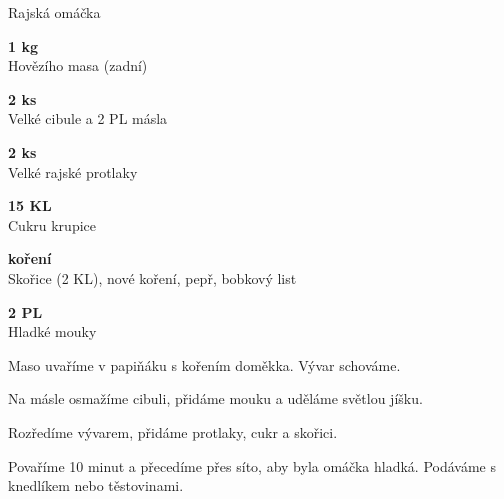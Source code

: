 \documentclass[11pt,a4paper]{article}
\begin{document}
\begin{recipe}[BrickRed]{Rajská omáčka}
    \begin{ingredients}
        \item \parbox[t]{\linewidth}{\raggedright \weight \textbf{1 kg}\\ Hovězího masa (zadní)}
        \item \parbox[t]{\linewidth}{\raggedright \piece \textbf{2 ks}\\ Velké cibule a 2 PL másla}
        \item \parbox[t]{\linewidth}{\raggedright \liquid \textbf{2 ks}\\ Velké rajské protlaky}
        \item \parbox[t]{\linewidth}{\raggedright \piece \textbf{15 KL}\\ Cukru krupice}
        \item \parbox[t]{\linewidth}{\raggedright \indefinite \textbf{koření}\\ Skořice (2 KL), nové koření, pepř, bobkový list}
        \item \parbox[t]{\linewidth}{\raggedright \spoon \textbf{2 PL}\\ Hladké mouky}
    \end{ingredients}
    \begin{steps}
        \item Maso uvaříme v papiňáku s kořením doměkka. Vývar schováme.
        \item Na másle osmažíme cibuli, přidáme mouku a uděláme světlou jíšku.
        \item Rozředíme vývarem, přidáme protlaky, cukr a skořici.
        \item Povaříme 10 minut a přecedíme přes síto, aby byla omáčka hladká. Podáváme s knedlíkem nebo těstovinami.
    \end{steps}
\end{recipe}
\end{document}
